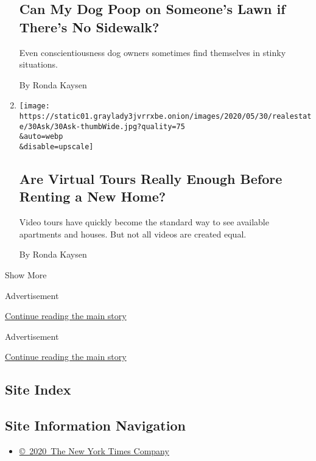 \begin{enumerate}
{  \subsection{Can My Dog Poop on Someone's Lawn if There's No
  Sidewalk?}\label{can-my-dog-poop-on-someones-lawn-if-theres-no-sidewalk}}

  Even conscientiousness dog owners sometimes find themselves in stinky
  situations.

  By Ronda Kaysen
\item
  \href{/2020/05/30/realestate/virtual-tours-renting-coronavirus.html}{}

  \texttt{[image: https://static01.graylady3jvrrxbe.onion/images/2020/05/30/realestate/30Ask/30Ask-thumbWide.jpg?quality=75\\\&auto=webp\\\&disable=upscale]}

  \hypertarget{are-virtual-tours-really-enough-before-renting-a-new-home}{%
  \subsection{Are Virtual Tours Really Enough Before Renting a New
  Home?}\label{are-virtual-tours-really-enough-before-renting-a-new-home}}

  Video tours have quickly become the standard way to see available
  apartments and houses. But not all videos are created equal.

  By Ronda Kaysen
\end{enumerate}

Show More

Advertisement

\protect\hyperlink{after-mid1}{Continue reading the main story}

Advertisement

\protect\hyperlink{after-mktg}{Continue reading the main story}

\hypertarget{site-index}{%
\subsection{Site Index}\label{site-index}}

\hypertarget{site-information-navigation}{%
\subsection{Site Information
Navigation}\label{site-information-navigation}}

\begin{itemize}
\tightlist
\item
  \href{https://help.nytimes3xbfgragh.onion/hc/en-us/articles/115014792127-Copyright-notice}{©~2020~The
  New York Times Company}
\end{itemize}

